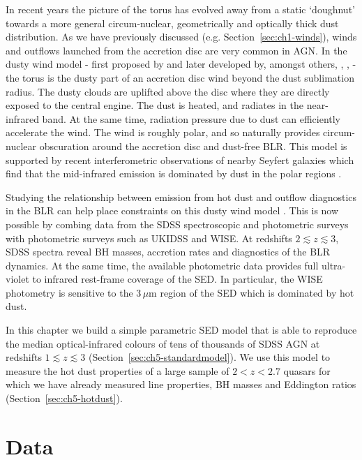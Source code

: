 In recent years the picture of the torus has evolved away from a static `doughnut' towards a more general circum-nuclear, geometrically and optically thick dust distribution. 
As we have previously discussed (e.g. Section~\ref{sec:ch1-winds}), winds and outflows launched from the accretion disc are very common in AGN. 
In the dusty wind model - first proposed by \citet{konigl94} and later developed by, amongst others, \citet{everett05}, \citet{elitzur06}, \citet{keating12} - the torus is the dusty part of an accretion disc wind beyond the dust sublimation radius.  
The dusty clouds are uplifted above the disc where they are directly exposed to the central engine. 
The dust is heated, and radiates in the near-infrared band.
At the same time, radiation pressure due to dust can efficiently accelerate the wind. 
The wind is roughly polar, and so naturally provides circum-nuclear obscuration around the accretion disc and dust-free BLR.   
This model is supported by recent interferometric observations of nearby Seyfert galaxies which find that the mid-infrared emission is dominated by dust in the polar regions \citep[e.g.][]{raban09,honig12,honig13,tristram14,lopez-gonzaga16}.

Studying the relationship between emission from hot dust and outflow diagnostics in the BLR can help place constraints on this dusty wind model \citep[e.g.][]{wang13}. 
This is now possible by combing data from the SDSS spectroscopic and photometric surveys with photometric surveys such as UKIDSS and WISE. 
At redshifts $2\lesssim z \lesssim3$, SDSS spectra reveal BH masses, accretion rates and diagnostics of the BLR dynamics. 
At the same time, the available photometric data provides full ultra-violet to infrared rest-frame coverage of the SED.
In particular, the WISE photometry is sensitive to the 3\,$\mu$m region of the SED which is dominated by hot dust. 

In this chapter we build a simple parametric SED model that is able to reproduce the median optical-infrared colours of tens of thousands of SDSS AGN at redshifts $1 \lesssim z \lesssim 3$ (Section~\ref{sec:ch5-standardmodel}).
We use this model to measure the hot dust properties of a large sample of $2 < z < 2.7$ quasars for which we have already measured  line properties, BH masses and Eddington ratios (Section~\ref{sec:ch5-hotdust}).

\section{Data}

